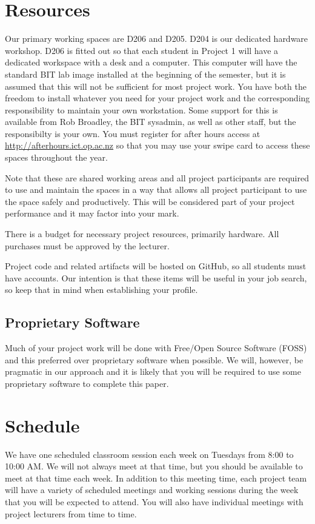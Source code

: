 \documentclass{article}
\begin{document}
\section*{Resources}

Our primary working spaces are D206 and D205. D204 is our dedicated hardware workshop. D206 is fitted out so that each student in Project 1 will have a dedicated workspace with a desk and a computer. This computer will have the standard BIT lab image installed at the beginning of the semester, but it is assumed that this will not be sufficient for most project work. You have both the freedom to install whatever you need for your project work and the corresponding responsibility to maintain your own workstation. Some support for this is available from Rob Broadley, the BIT sysadmin, as well as other staff, but the responsibilty is your own. You must register for after hours access at \url{http://afterhours.ict.op.ac.nz} so that you may use your swipe card to access these spaces throughout the year.

Note that these are shared working areas and all project participants are required to use and maintain the spaces in a way that allows all project participant to use the space safely and productively. This will be considered part of your project performance and it may factor into your mark.

There is a budget for necessary project resources, primarily hardware.  All purchases must be approved by the lecturer.

Project code and related artifacts will be hosted on GitHub, so all students must have accounts.  Our intention is that these items will be useful in your job search, so keep that in mind when establishing your profile.


	\subsection*{Proprietary Software}
	Much of your project work will be done with Free/Open Source Software (FOSS) and this preferred over proprietary software when possible. We will, however, be pragmatic in our approach and it is likely that you will be required to use some proprietary software to complete this paper.

\section*{Schedule}
We have one scheduled classroom session each week on Tuesdays from 8:00 to 10:00 AM. We will not always meet at that time, but you should be available to meet at that time each week. In addition to this meeting time, each project team will have a variety of scheduled meetings and working sessions during the week that you will be expected to attend. You will also have individual meetings with project lecturers from time to time.
 
\end{document}
